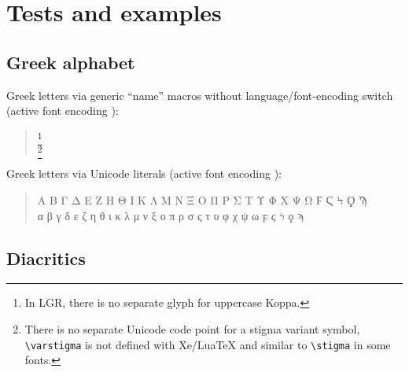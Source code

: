 \documentclass[a4paper]{scrartcl}
\newcommand{\cs}[1]{\texttt{\textbackslash#1}}
\begin{document}
\section{Tests and examples}

\subsection{Greek alphabet}

Greek letters via generic ``name'' macros without language/font-encoding
switch (active font encoding \encodingdefault):

\begin{quote}
  \Alpha{} \Beta{} \Gamma{} \Delta{} \Epsilon{} \Zeta{} \Eta{} \Theta{}
  \Iota{} \Kappa{} \Lambda{} \Mu{} \Nu{} \Xi{} \Omicron{} \Pi{} \Rho{}
  \Sigma{} \Tau{} \Upsilon{} \Phi{} \Chi{} \Psi{} \Omega{}
  \quad
  \Digamma{} \Stigma{} \Koppa
    \footnote{In LGR, there is no separate glyph for uppercase Koppa.}
  \Qoppa{} \Sampi{}
  \\
  \alpha{} \beta{} \gamma{} \delta{} \epsilon{} \zeta{} \eta{} \theta{}
  \iota{} \kappa{} \lambda{} \mu{} \nu{} \xi{} \omicron{} \pi{} \rho{}
  \sigma{} \finalsigma{} \tau{} \upsilon{} \phi{} \chi{} \psi{} \omega{}
  \quad
  \digamma{} \stigma{} \varstigma
    \footnote{There is no separate Unicode code point for a stigma variant
              symbol, \cs{varstigma} is not defined with
              Xe/LuaTeX and similar to \cs{stigma} in some fonts.}
   \koppa{} \qoppa{} \sampi{}

\end{quote}
%
Greek letters via Unicode literals (active font encoding \encodingdefault):

\begin{quote}
  Α Β Γ Δ Ε Ζ Η Θ Ι Κ Λ Μ Ν Ξ Ο Π Ρ Σ   Τ Υ Φ Χ Ψ Ω \quad Ϝ Ϛ Ϟ Ϙ Ϡ
  \\
  α β γ δ ε ζ η θ ι κ λ μ ν ξ ο π ρ σ ς τ υ φ χ ψ ω \quad ϝ ϛ ϟ ϙ ϡ
\end{quote}


\subsection{Diacritics \label{sec:diacritics}}
\end{document}
